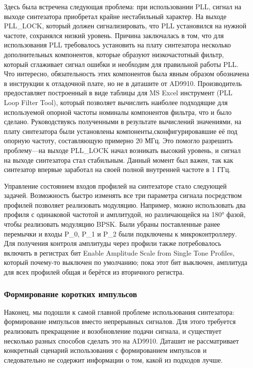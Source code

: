 \documentclass[rusmathsym, eqnumwithinsec, amspack, hyperref]{bomgost}
\begin{document}
Здесь была встречена следующая проблема: при использовании PLL, сигнал на выходе синтезатора приобретал крайне нестабильный характер. На выходе PLL\_LOCK, который должен сигнализировать, что PLL установился на нужной частоте, сохранялся низкий уровень. Причина заключалась в том, что для использования PLL требовалось установить на плату синтезатора несколько дополнительных компонентов, которые образуют низкочастотный фильтр, который сглаживает сигнал ошибки и необходим для правильной работы PLL. Что интересно, обязательность этих компонентов была явным образом обозначена в инструкции к отладочной плате, но не в даташите от AD9910. Производитель предоставляет построенный в виде таблицы для MS Excel инструмент (PLL Loop Filter Tool), который позволяет вычислить наиболее подходящие для используемой опорной частоты номиналы компонентов фильтра, что и было сделано. Руководствуясь полученными в результате вычислений значениями, на плату синтезатора были установлены компоненты,сконфигурировавшие её под опорную частоту, составляющую примерно 20 МГц. Это помогло разрешить проблему---на выходе PLL\_LOCK начал возникать высокий уровень, и сигнал на выходе синтезатора стал стабильным. Данный момент был важен, так как синтезатор впервые заработал на своей полной внутренней частоте в 1 ГГц.

Управление состоянием входов профилей на синтезаторе стало следующей задачей. Возможность быстро изменять все три параметра сигнала посредством профилей позволяет реализовать модуляцию. Например, можно использовать два профиля с одинаковой частотой и амплитудой, но различающейся на 180° фазой, чтобы реализовать модуляцию BPSK. Были убраны поставленные ранее перемычки и входы P\_0, P\_1 и P\_2 были подключены к микроконтроллеру. Для получения контроля амплитуды через профили также потребовалось включить в регистрах бит Enable Amplitude Scale from Single Tone Profiles, который почему-то выключен по умолчанию; пока этот бит выключен, амплитуда для всех профилей общая и берётся из вторичного регистра.

\subsubsection{Формирование коротких импульсов}

Наконец, мы подошли к самой главной проблеме использования синтезатора: формирование импульсов вместо непрерывных сигналов. Для этого требуется реализовать прекращение и возобновление подачи сигнала, и существует несколько разных способов сделать это на AD9910. Даташит не рассматривает конкретный сценарий использования с формированием импульсов и следовательно не содержит информации о том, какой из подходов лучше.
\end{document}
